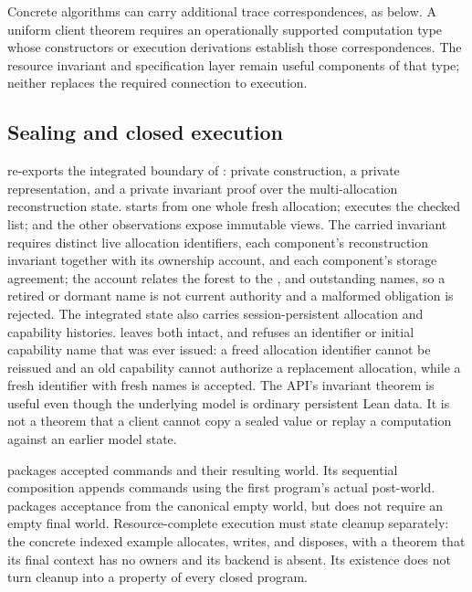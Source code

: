\documentclass[a4paper,UKenglish,cleveref]{lipics-v2021}
\begin{document}
Concrete algorithms can carry additional trace correspondences, as below. A
uniform client theorem requires an operationally supported computation type
whose constructors or execution derivations establish those correspondences.
The resource invariant and specification layer remain useful components of that
type; neither replaces the required connection to execution.

\subsection{Sealing and closed execution}

 re-exports the integrated boundary of
: private construction, a private representation, and a
private invariant proof over the multi-allocation reconstruction state.
 starts from one whole fresh allocation;  executes
the checked  list;  and the other observations expose
immutable views. The carried invariant requires distinct live allocation
identifiers, each
component's reconstruction invariant together with its ownership account, and
each component's storage agreement; the account relates the forest to the
,  and outstanding  names, so a retired
or dormant name is not current authority and a malformed obligation is rejected.
The integrated state also carries session-persistent allocation and capability
histories.  leaves both intact, and  refuses an
identifier or initial capability name that was ever issued: a freed allocation
identifier cannot be reissued and an old capability cannot authorize a
replacement allocation, while a fresh identifier with fresh names is accepted.
The API's invariant theorem
is useful even though the underlying model is ordinary persistent Lean data.
It is not a theorem that a client cannot copy a sealed value or replay a
computation against an earlier model state.

 packages accepted commands and their resulting world.
Its sequential composition appends commands using the first program's actual
post-world.  packages acceptance from the canonical empty
world, but does not require an empty final world. Resource-complete execution
must state cleanup separately: the concrete indexed  example
allocates, writes, and disposes, with a theorem that its final context has no
owners and its backend is absent. Its existence does not turn cleanup into a
property of every closed program.
\end{document}
